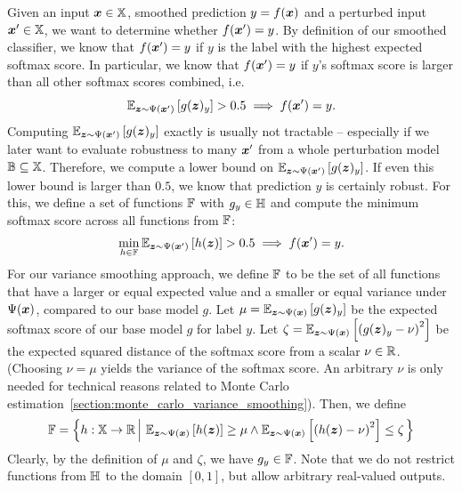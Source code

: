 Given an input ${\bm{x}} \in {\mathbb{X}}$, smoothed prediction $y = f({\bm{x}})$ and a perturbed input ${\bm{x}}' \in {\mathbb{X}}$, we want to determine whether $f({\bm{x}}') = y$.
By definition of our smoothed classifier, we know that $f({\bm{x}}') = y$ if $y$ is the label with the highest expected softmax score. In particular, we know that $f({\bm{x}}') = y$ if $y$'s softmax score is larger than all other softmax scores combined, i.e.
\begin{equation}\label{eq:variance_implication_1}
\mathbb{E}_{{\bm{z}} \sim \Psi({\bm{x}}')}
\left[g({\bm{z}})_y\right] > 0.5
\implies f({\bm{x}}') = y.
\end{equation}
Computing $
\mathbb{E}_{{\bm{z}} \sim \Psi({\bm{x}}')}
\left[g({\bm{z}})_y\right]
$ exactly is usually not tractable -- especially if we later want to evaluate robustness to many ${\bm{x}}'$ from a whole perturbation model ${\mathbb{B}} \subseteq {\mathbb{X}}$.
Therefore, we compute a lower bound on $
\mathbb{E}_{{\bm{z}} \sim \Psi({\bm{x}}')}
\left[g({\bm{z}})_y\right]
$. If even this lower bound is larger than $0.5$, we know that prediction $y$ is certainly robust.
For this, we define a set of functions ${\mathbb{F}}$ with $g_y \in {\mathbb{H}}$ and compute the minimum softmax score across all functions from ${\mathbb{F}}$:
\begin{equation}\label{eq:general_variance_basecertset}
\min_{h \in {\mathbb{F}}} 
\mathbb{E}_{{\bm{z}} \sim \Psi({\bm{x}}')}
\left[h({\bm{z}})\right] > 0.5
\implies f({\bm{x}}') = y.
\end{equation}
For our variance smoothing approach, we define ${\mathbb{F}}$ to be the set of all functions that have a larger or equal  expected value and a smaller or equal variance under $\Psi({\bm{x}})$, compared to our base model $g$.
Let $\mu = \mathbb{E}_{{\bm{z}} \sim \Psi({\bm{x}})}\left[g({\bm{z}})_y\right]$ be the expected softmax score of our base model $g$ for label $y$.
Let $\zeta = \mathbb{E}_{{\bm{z}} \sim \Psi({\bm{x}})}\left[\left(g({\bm{z}})_y - \nu \right)^2\right]$ be the expected squared distance of the softmax score from a scalar $\nu \in {\mathbb{R}}$. (Choosing $\nu = \mu$ yields the variance of the softmax score. An arbitrary $\nu$ is only needed for technical reasons related to Monte Carlo estimation~\autoref{section:monte_carlo_variance_smoothing}).
Then, we define
\begin{equation}\label{eq:function_family}
    \sF = \left\{
        h : \sX \rightarrow \sR
        \left| \ 
            \mathbb{E}_{\vz \sim \Psi(\vx)}\left[h(\vz)\right] \geq \mu
            \land
            \mathbb{E}_{\vz \sim \Psi(\vx)}\left[\left(h(\vz) - \nu \right)^2\right] \leq \zeta
        \right.
    \right\}
\end{equation}
Clearly, by the definition of $\mu$ and $\zeta$, we have $g_y \in {\mathbb{F}}$. Note that we do not restrict functions from ${\mathbb{H}}$ to the domain $[0,1]$, but allow arbitrary real-valued outputs.

